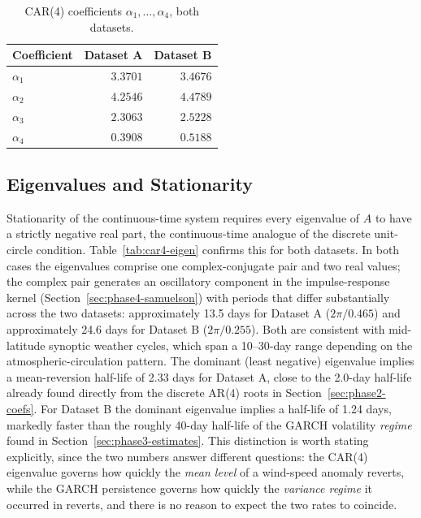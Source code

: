 \documentclass[11pt, a4paper, twoside]{article}
\begin{document}
\begin{table}[htbp]
\centering
\caption{CAR(4) coefficients $\alpha_1,\dots,\alpha_4$, both datasets.}
\label{tab:car4-alpha}
\begin{tabular}{l r r}
\toprule
\textbf{Coefficient} & \textbf{Dataset A} & \textbf{Dataset B} \\
\midrule
$\alpha_1$ & $3.3701$ & $3.4676$ \\
$\alpha_2$ & $4.2546$ & $4.4789$ \\
$\alpha_3$ & $2.3063$ & $2.5228$ \\
$\alpha_4$ & $0.3908$ & $0.5188$ \\
\bottomrule
\end{tabular}
\end{table}

\subsection{Eigenvalues and Stationarity}
\label{sec:phase4-eigen}

Stationarity of the continuous-time system requires every eigenvalue of $A$ to have a strictly negative real part, the continuous-time analogue of the discrete unit-circle condition. Table~\ref{tab:car4-eigen} confirms this for both datasets. In both cases the eigenvalues comprise one complex-conjugate pair and two real values; the complex pair generates an oscillatory component in the impulse-response kernel (Section~\ref{sec:phase4-samuelson}) with periods that differ substantially across the two datasets: approximately 13.5 days for Dataset A ($2\pi/0.465$) and approximately 24.6 days for Dataset B ($2\pi/0.255$). Both are consistent with mid-latitude synoptic weather cycles, which span a 10--30-day range depending on the atmospheric-circulation pattern. The dominant (least negative) eigenvalue implies a mean-reversion half-life of 2.33 days for Dataset A, close to the 2.0-day half-life already found directly from the discrete AR(4) roots in Section~\ref{sec:phase2-coefs}. For Dataset B the dominant eigenvalue implies a half-life of 1.24 days, markedly faster than the roughly 40-day half-life of the GARCH volatility \emph{regime} found in Section~\ref{sec:phase3-estimates}. This distinction is worth stating explicitly, since the two numbers answer different questions: the CAR(4) eigenvalue governs how quickly the \emph{mean level} of a wind-speed anomaly reverts, while the GARCH persistence governs how quickly the \emph{variance regime} it occurred in reverts, and there is no reason to expect the two rates to coincide.
\end{document}
